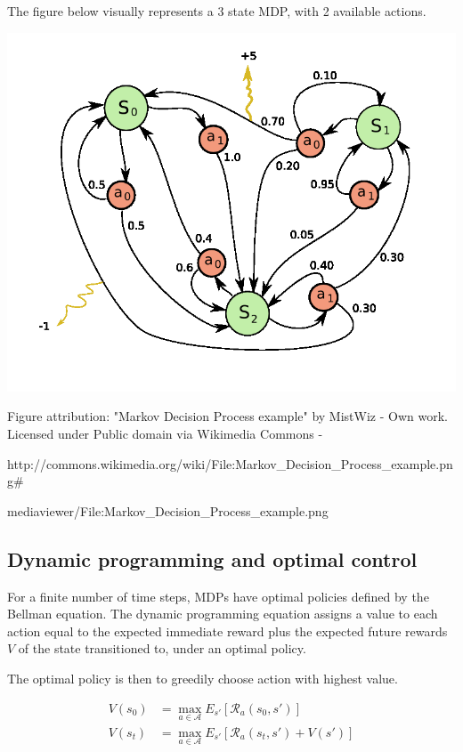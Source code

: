 \documentclass[11pt,a4,singlespacing,titlepagenumber=on]{scrreprt}
\numberwithin{equation}{chapter} %
\theoremstyle{remark}
\begin{document}
The figure below visually represents a 3 state MDP, with 2 available actions.

\includegraphics[scale=0.5]{MDP_example.png}

Figure attribution: "Markov Decision Process example" by MistWiz - Own work. Licensed under Public domain via Wikimedia Commons - 

http://commons.wikimedia.org/wiki/File:Markov\_Decision\_Process\_example.png\#

mediaviewer/File:Markov\_Decision\_Process\_example.png

\subsection{ Dynamic programming and optimal control }

For a finite number of time steps, MDPs have optimal policies defined by the Bellman equation. The dynamic programming equation assigns a value to each action equal to the expected immediate reward plus the expected future rewards $V$ of the state transitioned to, under an optimal policy.

The optimal policy is then to greedily choose action with highest value.

\begin{align}
	V(s_0) &= \max_{a \in \mathcal{A}} E_{s'}[\mathcal{R}_a(s_0,s')] \\
	V(s_t) &= \max_{a \in \mathcal{A}} E_{s'}[\mathcal{R}_a(s_t,s') + V(s')]
\end{align}
\end{document}
